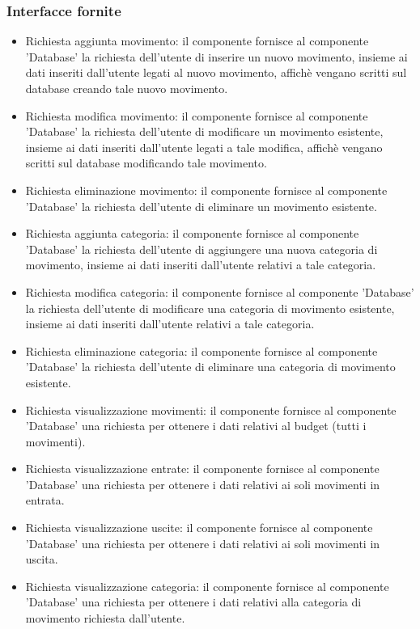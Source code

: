 \documentclass[a4paper,12pt]{article}
\begin{document}
\subsubsection*{Interfacce fornite}
\begin{itemize} \setlength\itemsep{0.01em}
\item {\sffamily Richiesta aggiunta movimento}: il componente fornisce al componente 'Database' la richiesta dell'utente di inserire un nuovo movimento, insieme ai dati inseriti dall'utente legati al nuovo movimento, affichè vengano scritti sul database creando tale nuovo movimento.
\item {\sffamily Richiesta modifica movimento}: il componente fornisce al componente 'Database'  la richiesta dell'utente di modificare un movimento esistente, insieme ai dati inseriti dall'utente legati a tale modifica, affichè vengano scritti sul database modificando tale movimento.
\item {\sffamily Richiesta eliminazione movimento}: il componente fornisce al componente 'Database'  la richiesta dell'utente di eliminare un movimento esistente.
\item {\sffamily Richiesta aggiunta categoria}: il componente fornisce al componente 'Database' la richiesta dell'utente di aggiungere una nuova categoria di movimento, insieme ai dati inseriti dall'utente relativi a tale categoria.
\item {\sffamily Richiesta modifica categoria}: il componente fornisce al componente 'Database' la richiesta dell'utente di modificare una categoria di movimento esistente, insieme ai dati inseriti dall'utente relativi a tale categoria.
\item {\sffamily Richiesta eliminazione categoria}: il componente fornisce al componente 'Database' la richiesta dell'utente di eliminare una categoria di movimento esistente.
\item {\sffamily Richiesta visualizzazione movimenti}: il componente fornisce al componente 'Database' una richiesta per ottenere i dati relativi al budget (tutti i movimenti).
\item {\sffamily Richiesta visualizzazione entrate}: il componente fornisce al componente 'Database' una richiesta per ottenere i dati relativi ai soli movimenti in entrata.
\item {\sffamily Richiesta visualizzazione uscite}: il componente fornisce al componente 'Database' una richiesta per ottenere i dati relativi ai soli movimenti in uscita.
\item {\sffamily Richiesta visualizzazione categoria}: il componente fornisce al componente 'Database' una richiesta per ottenere i dati relativi alla categoria di movimento richiesta dall'utente.
\end{itemize}
\end{document}
